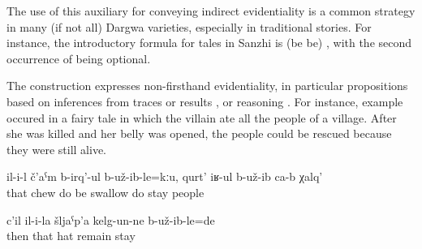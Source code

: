 The use of this auxiliary for conveying indirect evidentiality is a common strategy in many (if not all) Dargwa varieties, especially in traditional stories. For instance, the introductory formula for tales in Sanzhi is  (be  be) , with the second occurrence of  being optional.

The construction expresses non-firsthand evidentiality, in particular propositions based on inferences from traces or results ,  or reasoning . For instance, example  occured in a fairy tale in which the villain ate all the people of a village. After she was killed and her belly was opened, the people could be rescued because they were still alive.
%
\begin{exe}
	\ex	\label{ex:(It turned out that) she did not chew the people, but swallowed them@13}
	\gll	il-i-l	č'aˁm	b-irq'-ul	b-už-ib-le=kːu,	qurt' 	iʁ-ul	b-už-ib ca-b	χalq'\\
		that	chew	do	be	swallow	do	stay  people\\
	\glt	{}

	\ex	\label{ex:Then (apparently) his hat remained there@14}
	\gll	c'il	il-i-la	šljaˁp'a	kelg-un-ne	b-už-ib-le=de\\
		then	that	hat	remain	stay\\
	\glt	{}
\end{exe}

